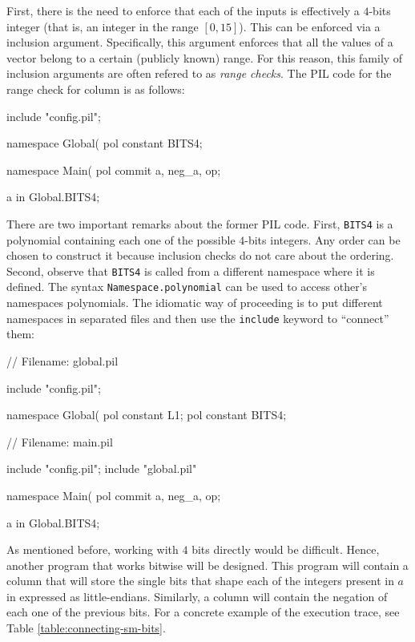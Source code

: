 First, there is the need to enforce that each of the inputs is effectively a $4$-bits integer (that is, an integer in the range $[0,15]$). This can be enforced via a inclusion argument. Specifically, this argument enforces that all the values of a vector belong to a certain (publicly known) range. For this reason, this family of inclusion arguments are often refered to as \textit{range checks}. The PIL code for the range check for column \att is as follows:
\begin{pil}
include "config.pil";

namespace Global(%
    pol constant BITS4;
    
namespace Main(%
    pol commit a, neg_a, op;
    
    a in Global.BITS4;
\end{pil}

There are two important remarks about the former PIL code. First, \texttt{BITS4} is a polynomial containing each one of the possible $4$-bits integers. Any order can be chosen to construct it because inclusion checks do not care about the ordering. Second, observe that \texttt{BITS4} is called from a different namespace where it is defined. The syntax \texttt{Namespace.polynomial} can be used to access other's namespaces polynomials. The idiomatic way of proceeding is to put different namespaces in separated files and then use the \texttt{include} keyword to ``connect'' them:
\begin{pil}
// Filename: global.pil

include "config.pil";

namespace Global(%
    pol constant L1;
    pol constant BITS4;
\end{pil}

\begin{pil}
// Filename: main.pil

include "config.pil";
include "global.pil"

namespace Main(%
    pol commit a, neg_a, op;

    a in Global.BITS4;
\end{pil}

As mentioned before, working with $4$ bits directly would be difficult. Hence, another program that works bitwise will be designed. This program will contain a column \bits that will store the single bits that shape each of the integers present in $a$ in expressed as little-endians. Similarly, a column \nbits will contain the negation of each one of the previous bits. For a concrete example of the execution trace, see Table \ref{table:connecting-sm-bits}. 


